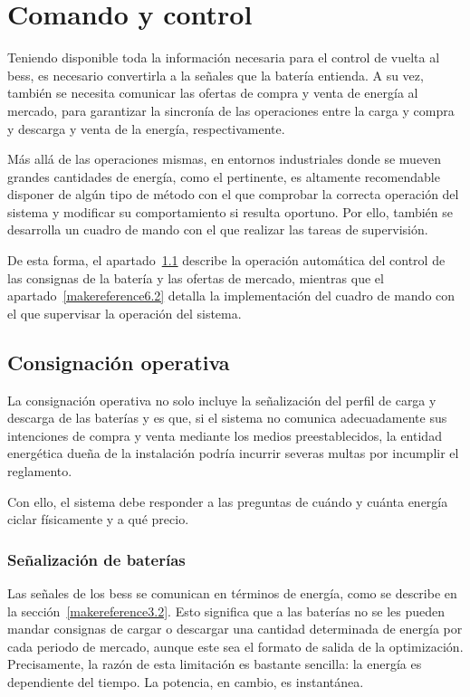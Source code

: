 \cleardoublepage

\chapter{Comando y control}
\label{makereference6}

Teniendo disponible toda la información necesaria para el control de vuelta al \gls{bess}, es necesario convertirla a la señales que la batería entienda. A su vez, también se necesita comunicar las ofertas de compra y venta de energía al mercado, para garantizar la sincronía de las operaciones entre la carga y compra y descarga y venta de la energía, respectivamente.

Más allá de las operaciones mismas, en entornos industriales donde se mueven grandes cantidades de energía, como el pertinente, es altamente recomendable disponer de algún tipo de método con el que comprobar la correcta operación del sistema y modificar su comportamiento si resulta oportuno. Por ello, también se desarrolla un cuadro de mando con el que realizar las tareas de supervisión.

De esta forma, el apartado~\ref{makereference6.1} describe la operación automática del control de las consignas de la batería y las ofertas de mercado, mientras que el apartado~\ref{makereference6.2} detalla la implementación del cuadro de mando con el que supervisar la operación del sistema.

\section{Consignación operativa}
\label{makereference6.1}

La consignación operativa no solo incluye la señalización del perfil de carga y descarga de las baterías y es que, si el sistema no comunica adecuadamente sus intenciones de compra y venta mediante los medios preestablecidos, la entidad energética dueña de la instalación podría incurrir severas multas por incumplir el reglamento.

Con ello, el sistema debe responder a las preguntas de cuándo y cuánta energía ciclar físicamente y a qué precio.

\subsection{Señalización de baterías}
\label{makereference6.1.1}

Las señales de los \gls{bess} se comunican en términos de energía, como se describe en la sección~\ref{makereference3.2}. Esto significa que a las baterías no se les pueden mandar consignas de cargar o descargar una cantidad determinada de energía por cada periodo de mercado, aunque este sea el formato de salida de la optimización. Precisamente, la razón de esta limitación es bastante sencilla: la energía es dependiente del tiempo. La potencia, en cambio, es instantánea.

